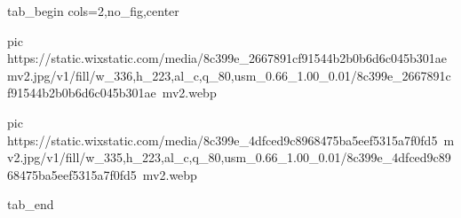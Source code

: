  
 
 
 
 


\ifcmt
  tab_begin cols=2,no_fig,center

     pic https://static.wixstatic.com/media/8c399e_2667891cf91544b2b0b6d6c045b301ae~mv2.jpg/v1/fill/w_336,h_223,al_c,q_80,usm_0.66_1.00_0.01/8c399e_2667891cf91544b2b0b6d6c045b301ae~mv2.webp
		 
		 pic https://static.wixstatic.com/media/8c399e_4dfced9c8968475ba5eef5315a7f0fd5~mv2.jpg/v1/fill/w_335,h_223,al_c,q_80,usm_0.66_1.00_0.01/8c399e_4dfced9c8968475ba5eef5315a7f0fd5~mv2.webp

  tab_end
\fi
